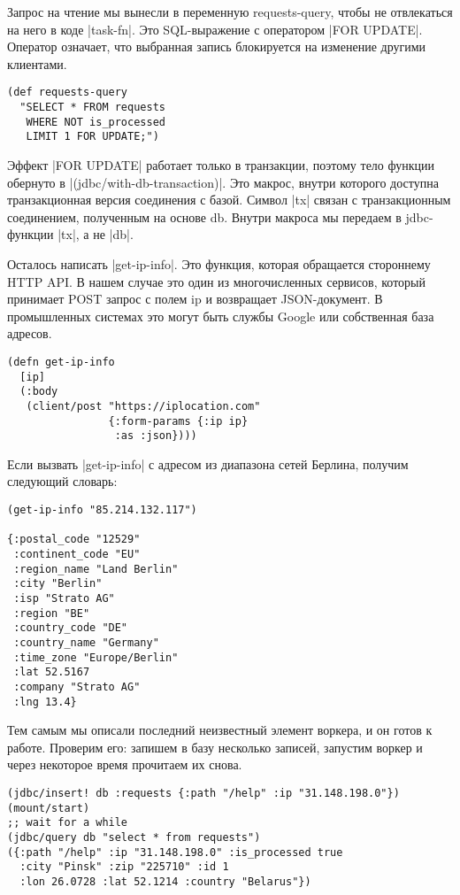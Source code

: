 Запрос на чтение мы вынесли в переменную requests-query, чтобы не отвлекаться на
него в коде \spverb|task-fn|. Это SQL-выражение с оператором \spverb|FOR UPDATE|. Оператор
означает, что выбранная запись блокируется на изменение другими клиентами.

\begin{verbatim}
(def requests-query
  "SELECT * FROM requests
   WHERE NOT is_processed
   LIMIT 1 FOR UPDATE;")
\end{verbatim}

Эффект \spverb|FOR UPDATE| работает только в транзакции, поэтому тело функции обернуто
в \spverb|(jdbc/with-db-transaction)|. Это макрос, внутри которого доступна
транзакционная версия соединения с базой. Символ \spverb|tx| связан с транзакционным
соединением, полученным на основе db. Внутри макроса мы передаем в jdbc-функции
\spverb|tx|, а не \spverb|db|.

Осталось написать \spverb|get-ip-info|. Это функция, которая обращается стороннему HTTP
API. В нашем случае это один из многочисленных сервисов, который принимает POST
запрос с полем ip и возвращает JSON-документ. В промышленных системах это могут
быть службы Google или собственная база адресов.

\begin{verbatim}
(defn get-ip-info
  [ip]
  (:body
   (client/post "https://iplocation.com"
                {:form-params {:ip ip}
                 :as :json})))
\end{verbatim}

Если вызвать \spverb|get-ip-info| с адресом из диапазона сетей Берлина, получим
следующий словарь:

\begin{verbatim}
(get-ip-info "85.214.132.117")

{:postal_code "12529"
 :continent_code "EU"
 :region_name "Land Berlin"
 :city "Berlin"
 :isp "Strato AG"
 :region "BE"
 :country_code "DE"
 :country_name "Germany"
 :time_zone "Europe/Berlin"
 :lat 52.5167
 :company "Strato AG"
 :lng 13.4}
\end{verbatim}

Тем самым мы описали последний неизвестный элемент воркера, и он готов к
работе. Проверим его: запишем в базу несколько записей, запустим воркер и через
некоторое время прочитаем их снова.

\begin{verbatim}
(jdbc/insert! db :requests {:path "/help" :ip "31.148.198.0"})
(mount/start)
;; wait for a while
(jdbc/query db "select * from requests")
({:path "/help" :ip "31.148.198.0" :is_processed true
  :city "Pinsk" :zip "225710" :id 1
  :lon 26.0728 :lat 52.1214 :country "Belarus"})
\end{verbatim}


